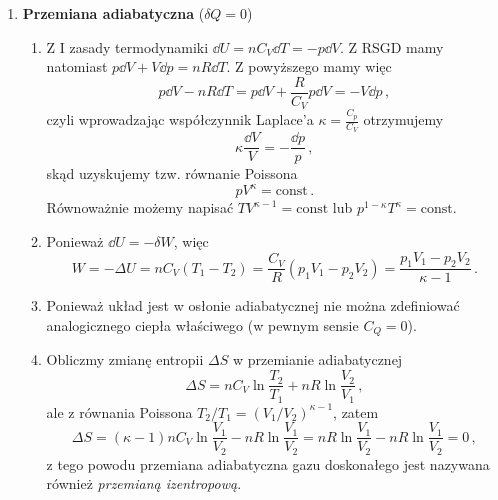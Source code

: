 \documentclass[../main.tex]{subfiles}
\begin{document}
\begin{enumerate}
    \item \textbf{Przemiana adiabatyczna} (\(\delta Q=0\))
    
    \begin{enumerate}
        \item Z I zasady termodynamiki \(\dd{U}=nC_V\dd{T}=-p\dd{V}\). Z RSGD mamy natomiast \(p\dd{V}+V\dd{p}=nR\dd{T}\). Z powyższego mamy więc
        \begin{equation*}
            p\dd{V}-nR\dd{T}=p\dd{V}+\frac{R}{C_V}p\dd{V}=-V\dd{p}\,,
        \end{equation*}
        czyli wprowadzając współczynnik Laplace'a \(\kappa=\frac{C_p}{C_V}\) otrzymujemy
        \begin{equation*}
            \kappa \frac{\dd V}{V}=-\frac{\dd{p}}{p}\,,
        \end{equation*}
        skąd uzyskujemy tzw. równanie Poissona
        \begin{equation*}
            pV^\kappa=\text{const}\,.
        \end{equation*}
        Równoważnie możemy napisać \(TV^{\kappa-1}=\text{const}\) lub \(p^{1-\kappa}T^\kappa=\text{const}\).
        \item Ponieważ \(\dd{U}=-\delta W\), więc
        \begin{equation*}
            W=-\Delta U=nC_V(T_1-T_2)=\frac{C_V}{R}(p_1V_1-p_2V_2)=\frac{p_1V_1-p_2V_2}{\kappa-1}\,.
        \end{equation*}
        \item Ponieważ układ jest w osłonie adiabatycznej nie można zdefiniować analogicznego ciepła właściwego (w pewnym sensie \(C_Q=0\)).
        \item Obliczmy zmianę entropii \(\Delta S\) w przemianie adiabatycznej
        \begin{equation*}
            \Delta S=nC_V\ln\frac{T_2}{T_1}+nR\ln\frac{V_2}{V_1}\,,
        \end{equation*}
        ale z równania Poissona \(T_2/T_1=(V_1/V_2)^{\kappa-1}\), zatem
        \begin{equation*}
            \Delta S=(\kappa -1)nC_V\ln\frac{V_1}{V_2}-nR\ln\frac{V_1}{V_2}=nR\ln\frac{V_1}{V_2}-nR\ln\frac{V_1}{V_2}=0\,,
        \end{equation*}
        z tego powodu przemiana adiabatyczna gazu doskonałego jest nazywana również \textit{przemianą izentropową}.
    \end{enumerate}
\end{enumerate}
\end{document}
